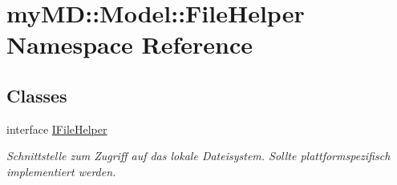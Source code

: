 \hypertarget{namespacemy_m_d_1_1_model_1_1_file_helper}{
\section{my\-MD::Model::File\-Helper Namespace Reference}
\label{d4/de9/namespacemy_m_d_1_1_model_1_1_file_helper}
}


\subsection*{Classes}
\begin{CompactItemize}
\item 
interface \hyperlink{interfacemy_m_d_1_1_model_1_1_file_helper_1_1_i_file_helper}{IFile\-Helper}
\begin{CompactList}\small\item\em Schnittstelle zum Zugriff auf das lokale Dateisystem. Sollte plattformspezifisch implementiert werden. \item\end{CompactList}\end{CompactItemize}
